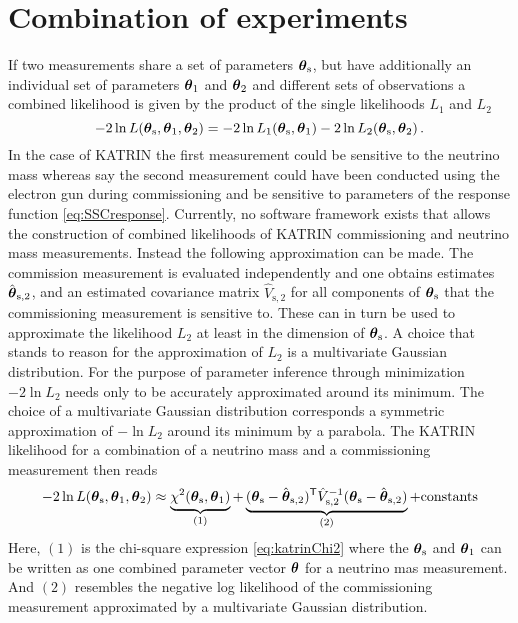\section{Combination of experiments}
If two measurements share a set of parameters $\boldsymbol{\mathbf{\theta}}_\mathrm{s}$, but have additionally an individual set of parameters $\boldsymbol{\mathbf{\theta}}_1$ and $\boldsymbol{\mathbf{\theta}}_2$ and different sets of observations a combined likelihood is given by the product of the single likelihoods $L_1$ and $L_2$
\begin{equation}
	-2\ln L(\boldsymbol{\mathbf{\theta}}_\mathrm{s}, \boldsymbol{\mathbf{\theta}}_1, \boldsymbol{\mathbf{\theta}}_2) =  
		-2\ln L_1(\boldsymbol{\mathbf{\theta}}_\mathrm{s}, \boldsymbol{\mathbf{\theta}}_1)
		-2\ln L_2(\boldsymbol{\mathbf{\theta}}_\mathrm{s}, \boldsymbol{\mathbf{\theta}}_2)
	\text{\,.}
\end{equation}
In the case of KATRIN the first measurement could be sensitive to the neutrino mass whereas say the second measurement could have been conducted using the electron gun during commissioning and be sensitive to parameters of the response function \eqref{eq:SSCresponse}. Currently, no software framework exists that allows the construction of combined likelihoods of KATRIN commissioning and neutrino mass measurements. Instead the following approximation can be made. The commission measurement is evaluated independently and one obtains estimates $\hat{\boldsymbol{\mathbf{\theta}}}_\mathrm{s,2}$, and an estimated covariance matrix $\hat{V}_\mathrm{s,2}$ for all components of $\boldsymbol{\mathbf{\theta}}_\mathrm{s}$ that the commissioning measurement is sensitive to. These can in turn be used to approximate the likelihood $L_2$ at least in the dimension of $\boldsymbol{\mathbf{\theta}}_\mathrm{s}$. A choice that stands to reason for the approximation of $L_2$ is a multivariate Gaussian distribution. For the purpose of parameter inference through minimization $-2\ln L_2$ needs only to be accurately approximated around its minimum. The choice of a multivariate Gaussian distribution corresponds a symmetric approximation of $-\ln L_2$ around its minimum by a parabola. The KATRIN likelihood for a combination of a neutrino mass and a commissioning measurement then reads
\begin{equation}
	-2\ln L(\paramVecShared, \paramVec_1, \paramVec_2) \approx 
	\underbrace{
		\chi^2(\paramVecShared, \paramVec_1)
		\vphantom{(\paramVecShared - \hat{\paramVec}_\mathrm{s,2})^{\mathsf{T}}}
	}_{(1)}
	+
	\underbrace{
		(\paramVecShared - \hat{\paramVec}_\mathrm{s,2})^{\mathsf{T}}
		\hat{V}_\mathrm{s,2}^{-1}
		(\paramVecShared - \hat{\paramVec}_\mathrm{s,2})
	}_{(2)}
	+ \mathrm{constants}
\end{equation}
Here, $(1)$ is the chi-square expression \eqref{eq:katrinChi2} where the $\boldsymbol{\mathbf{\theta}}_\mathrm{s}$ and $\boldsymbol{\mathbf{\theta}}_1$ can be written as one combined parameter vector $\boldsymbol{\mathbf{\theta}}$ for a neutrino mas measurement. And $(2)$ resembles the negative log likelihood of the commissioning measurement approximated by a multivariate Gaussian distribution. 


